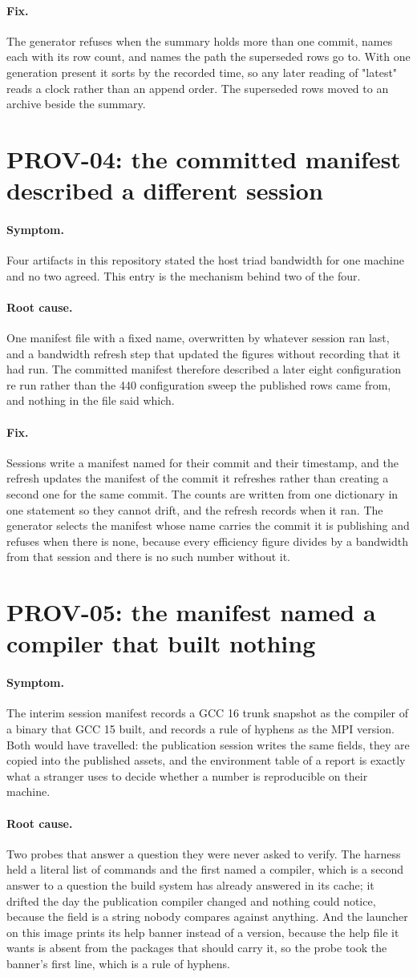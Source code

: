 \documentclass[11pt,a4paper]{report}
\newcommand{\symptom}[1]{\paragraph{Symptom.}#1}
\newcommand{\rootcause}[1]{\paragraph{Root cause.}#1}
\newcommand{\fix}[1]{\paragraph{Fix.}#1}
\begin{document}
\fix{The generator refuses when the summary holds more than one commit, names
each with its row count, and names the path the superseded rows go to. With one
generation present it sorts by the recorded time, so any later reading of
"latest" reads a clock rather than an append order. The superseded rows moved to
an archive beside the summary.}

\section{PROV-04: the committed manifest described a different session}

\symptom{Four artifacts in this repository stated the host triad bandwidth for
one machine and no two agreed. This entry is the mechanism behind two of the
four.}

\rootcause{One manifest file with a fixed name, overwritten by whatever session
ran last, and a bandwidth refresh step that updated the figures without recording
that it had run. The committed manifest therefore described a later eight
configuration re run rather than the 440 configuration sweep the published rows
came from, and nothing in the file said which.}

\fix{Sessions write a manifest named for their commit and their timestamp, and
the refresh updates the manifest of the commit it refreshes rather than creating
a second one for the same commit. The counts are written from one dictionary in
one statement so they cannot drift, and the refresh records when it ran. The
generator selects the manifest whose name carries the commit it is publishing and
refuses when there is none, because every efficiency figure divides by a
bandwidth from that session and there is no such number without it.}

\section{PROV-05: the manifest named a compiler that built nothing}

\symptom{The interim session manifest records a GCC 16 trunk snapshot as the
compiler of a binary that GCC 15 built, and records a rule of hyphens as the MPI
version. Both would have travelled: the publication session writes the same
fields, they are copied into the published assets, and the environment table of
a report is exactly what a stranger uses to decide whether a number is
reproducible on their machine.}

\rootcause{Two probes that answer a question they were never asked to verify.
The harness held a literal list of commands and the first named a compiler,
which is a second answer to a question the build system has already answered in
its cache; it drifted the day the publication compiler changed and nothing could
notice, because the field is a string nobody compares against anything. And the
launcher on this image prints its help banner instead of a version, because the
help file it wants is absent from the packages that should carry it, so the
probe took the banner's first line, which is a rule of hyphens.}
\end{document}
